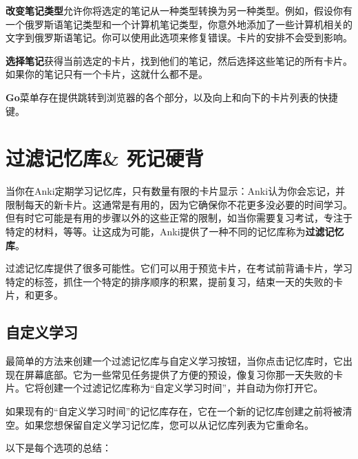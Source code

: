 \documentclass[a4paper]{book}
\begin{document}
			\textbf{改变笔记类型}允许你将选定的笔记从一种类型转换为另一种类型。例如，假设你有一个俄罗斯语笔记类型和一个计算机笔记类型，你意外地添加了一些计算机相关的文字到俄罗斯语笔记。你可以使用此选项来修复错误。卡片的安排不会受到影响。
			
			\textbf{选择笔记}获得当前选定的卡片，找到他们的笔记，然后选择这些笔记的所有卡片。如果你的笔记只有一个卡片，这就什么都不是。
			
			\textbf{Go}菜单存在提供跳转到浏览器的各个部分，以及向上和向下的卡片列表的快捷键。
			
			\chapter{过滤记忆库\& 死记硬背}\label{}
			
			当你在Anki定期学习记忆库，只有数量有限的卡片显示：Anki认为你会忘记，并限制每天的新卡片。这通常是有用的，因为它确保你不花更多没必要的时间学习。但有时它可能是有用的步骤以外的这些正常的限制，如当你需要复习考试，专注于特定的材料，等等。让这成为可能，Anki提供了一种不同的记忆库称为\textbf{过滤记忆库}。
			
			过滤记忆库提供了很多可能性。它们可以用于预览卡片，在考试前背诵卡片，学习特定的标签，抓住一个特定的排序顺序的积累，提前复习，结束一天的失败的卡片，和更多。
			
			\section{自定义学习}
			
			最简单的方法来创建一个过滤记忆库与自定义学习按钮，当你点击记忆库时，它出现在屏幕底部。它为一些常见任务提供了方便的预设，像复习你那一天失败的卡片。它将创建一个过滤记忆库称为“自定义学习时间”，并自动为你打开它。
			
			如果现有的“自定义学习时间”的记忆库存在，它在一个新的记忆库创建之前将被清空。如果您想保留自定义学习记忆库，您可以从记忆库列表为它重命名。
			
			以下是每个选项的总结：
			
\end{document}
